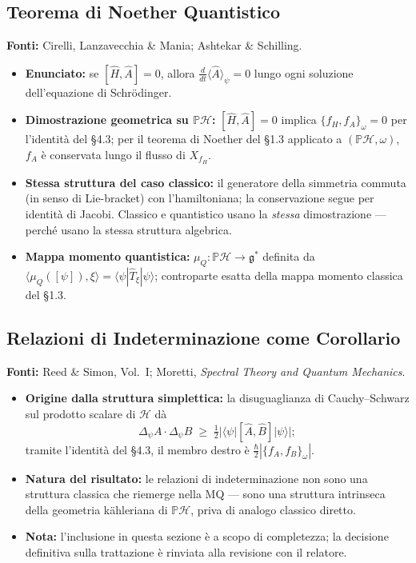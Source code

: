 \documentclass[12pt, a4paper]{article}
\newcommand{\fonti}[1]{%
	\begin{fontebox}
		\textcolor{fontecolor}{\footnotesize\textbf{Fonti:} #1}
	\end{fontebox}%
}
\begin{document}
	
	\subsection{Teorema di Noether Quantistico}
	
	\fonti{Cirelli, Lanzavecchia \& Mania; Ashtekar \& Schilling.}
	
	\begin{itemize}
		\item \textbf{Enunciato:} se $[\hat{H}, \hat{A}] = 0$, allora
		$\frac{d}{dt}\langle\hat{A}\rangle_\psi = 0$ lungo ogni soluzione dell'equazione
		di Schrödinger.
		\item \textbf{Dimostrazione geometrica su $\mathbb{P}\mathcal{H}$:}
		$[\hat{H}, \hat{A}] = 0$ implica $\{f_H, f_A\}_\omega = 0$ per l'identità del §4.3;
		per il teorema di Noether del §1.3 applicato a $(\mathbb{P}\mathcal{H}, \omega)$,
		$f_A$ è conservata lungo il flusso di $X_{f_H}$.
		\item \textbf{Stessa struttura del caso classico:} il generatore della simmetria
		commuta (in senso di Lie-bracket) con l'hamiltoniana; la conservazione segue per
		identità di Jacobi. Classico e quantistico usano la \emph{stessa} dimostrazione
		--- perché usano la stessa struttura algebrica.
		\item \textbf{Mappa momento quantistica:} $\mu_Q: \mathbb{P}\mathcal{H} \to
		\mathfrak{g}^*$ definita da $\langle\mu_Q([\psi]), \xi\rangle = \langle\psi|\hat{T}_\xi|\psi\rangle$;
		controparte esatta della mappa momento classica del §1.3.
	\end{itemize}
	
	\subsection{Relazioni di Indeterminazione come Corollario}
	
	\fonti{Reed \& Simon, Vol.~I; Moretti, \textit{Spectral Theory and Quantum Mechanics}.}
	
	\begin{itemize}
		\item \textbf{Origine dalla struttura simplettica:} la disuguaglianza di Cauchy--Schwarz
		sul prodotto scalare di $\mathcal{H}$ dà
		\[
		\Delta_\psi A \cdot \Delta_\psi B \;\geq\; \tfrac{1}{2}|\langle\psi|[\hat{A},\hat{B}]|\psi\rangle|;
		\]
		tramite l'identità del §4.3, il membro destro è $\tfrac{\hbar}{2}|\{f_A,f_B\}_\omega|$.
		\item \textbf{Natura del risultato:} le relazioni di indeterminazione non sono una
		struttura classica che riemerge nella MQ --- sono una struttura intrinseca della
		geometria kähleriana di $\mathbb{P}\mathcal{H}$, priva di analogo classico diretto.
		\item \textbf{Nota:} l'inclusione in questa sezione è a scopo di completezza; la
		decisione definitiva sulla trattazione è rinviata alla revisione con il relatore.
	\end{itemize}
	
\end{document}
